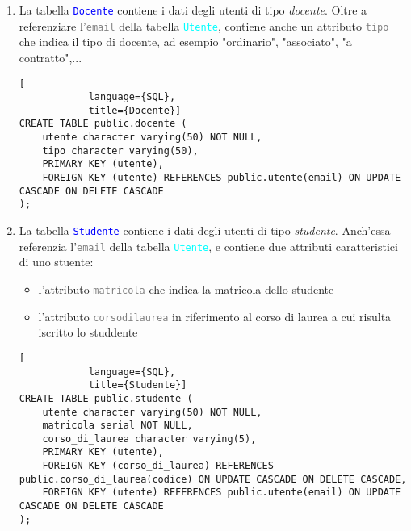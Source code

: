 \documentclass{article}
\newcommand{\tabb}[1]{\texttt{\textcolor{blue}{#1}}}
\newcommand{\tab}[1]{\texttt{\textcolor{cyan}{#1}}}
\newcommand{\attr}[1]{\texttt{\textcolor{gray}{#1}}}
\newcommand{\und}[0]{\textunderscore}
\begin{document}
\begin{enumerate}
        \item La tabella \tabb{Docente} contiene i dati degli utenti di tipo \textit{docente}. Oltre a referenziare l'\attr{email} della tabella \tab{Utente}, contiene anche un attributo \attr{tipo} che indica il tipo di docente, ad esempio "ordinario", "associato", "a contratto",...
        \begin{lstlisting}[
            language={SQL},
            title={Docente}]
CREATE TABLE public.docente (
    utente character varying(50) NOT NULL,
    tipo character varying(50),
    PRIMARY KEY (utente),
    FOREIGN KEY (utente) REFERENCES public.utente(email) ON UPDATE CASCADE ON DELETE CASCADE
);
        \end{lstlisting}

        \item La tabella \tabb{Studente} contiene i dati degli utenti di tipo \textit{studente}. Anch'essa referenzia l'\attr{email} della tabella \tab{Utente}, e contiene due attributi caratteristici di uno stuente:
        \begin{itemize}
            \item l'attributo \attr{matricola} che indica la matricola dello studente
            \item l'attributo \attr{corso\und di\und laurea} in riferimento al corso di laurea a cui risulta iscritto lo studdente
        \end{itemize}
        \begin{lstlisting}[
            language={SQL},
            title={Studente}]
CREATE TABLE public.studente (
    utente character varying(50) NOT NULL,
    matricola serial NOT NULL,
    corso_di_laurea character varying(5),
    PRIMARY KEY (utente),
    FOREIGN KEY (corso_di_laurea) REFERENCES public.corso_di_laurea(codice) ON UPDATE CASCADE ON DELETE CASCADE,
    FOREIGN KEY (utente) REFERENCES public.utente(email) ON UPDATE CASCADE ON DELETE CASCADE
);
        \end{lstlisting}


\end{enumerate}
\end{document}

